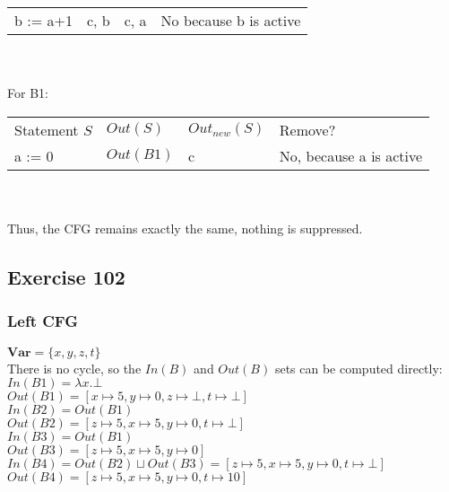 \documentclass[12pt,fleqn]{article}		%
\begin{document}
\begin{enumerate}
\begin{tabularx}{\textwidth}{X X X X}
b := a+1 & c, b & c, a & No because b is active
\end{tabularx}
\\\\
For B1:\\
\begin{tabularx}{\textwidth}{X X X X}
Statement $S$ & $Out(S)$ & $Out_{new}(S)$ & Remove?\\
a := 0 & $Out(B1)$ & c & No, because a is active\\
\end{tabularx}
\\\\
Thus, the CFG remains exactly the same, nothing is suppressed.
\end{enumerate}

\subsection{Exercise 102}
\subsubsection{Left CFG}
$ \textbf{Var} = \{x, y, z, t\} $\\
There is no cycle, so the $In(B)$ and $Out(B)$ sets can be computed directly:\\
$ In(B1) = \lambda x . \bot$\\
$ Out(B1) = [x \mapsto 5, y \mapsto 0, z \mapsto \bot, t \mapsto \bot]$\\
$ In(B2) = Out(B1)$\\
$ Out(B2) = [z \mapsto 5, x \mapsto 5, y \mapsto 0, t \mapsto \bot]$\\
$ In(B3) = Out(B1)$\\
$ Out(B3) = [z \mapsto 5, x \mapsto 5, y \mapsto 0]$\\
$ In(B4) = Out(B2) \sqcup Out(B3) = [z \mapsto 5, x \mapsto 5, y \mapsto 0, t \mapsto \bot]$\\
$ Out(B4) = [z \mapsto 5, x \mapsto 5, y \mapsto 0, t \mapsto 10] $\\
\end{document}

